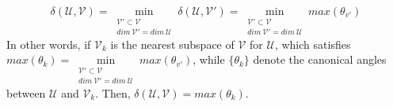 \documentclass[22pt]{article}
\begin{document}
		 \begin{equation}
		 	\delta(\mathcal{U,V}) = \min_{\substack{\mathcal{V'}\subset \mathcal{V}\\ dim\ \mathcal{V'} = dim\ \mathcal{U}}} \delta(\mathcal{U,V'}) = \min_{\substack{\mathcal{V'}\subset \mathcal{V}\\ dim\ \mathcal{V'} = dim\ \mathcal{U}}} max(\theta_{v'})
		 \end{equation}
		 In other words, if $\mathcal{V}_k$ is the nearest subspace of $\mathcal{V}$ for $\mathcal{U}$, which satisfies $max(\theta_{k}) = \min\limits_{\substack{\mathcal{V'}\subset \mathcal{V}\\ dim\ \mathcal{V'} = dim\ \mathcal{U}}} max(\theta_{v'})$, while $\{\theta_k\}$ denote the canonical angles between $\mathcal{U}$ and $\mathcal{V}_k$. Then, $\delta(\mathcal{U,V}) = max(\theta_{k})$.
\end{document}
